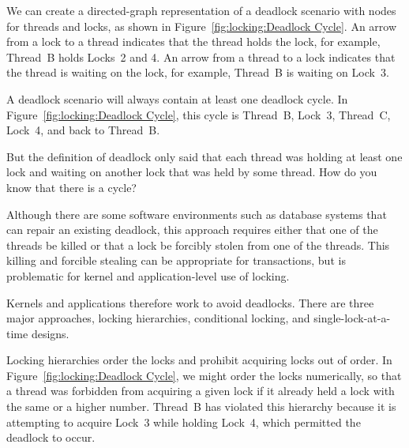 We can create a directed-graph representation of a deadlock scenario
with nodes for threads and locks, as shown in
Figure~\ref{fig:locking:Deadlock Cycle}.
An arrow from a lock to a thread indicates that the thread holds
the lock, for example, Thread~B holds Locks~2 and 4.
An arrow from a thread to a lock indicates that the thread is waiting
on the lock, for example, Thread~B is waiting on Lock~3.

A deadlock scenario will always contain at least one deadlock cycle.
In Figure~\ref{fig:locking:Deadlock Cycle}, this cycle is
Thread~B, Lock~3, Thread~C, Lock~4, and back to Thread~B.

\QuickQuiz{}
	But the definition of deadlock only said that each thread
	was holding at least one lock and waiting on another lock
	that was held by some thread.
	How do you know that there is a cycle?
 \QuickQuizEnd

Although there are some software environments such as database systems
that can repair an existing deadlock, this approach requires either that
one of the threads be killed or that a lock be forcibly stolen from one
of the threads.
This killing and forcible stealing can be appropriate for transactions,
but is problematic for kernel and application-level use of locking.

Kernels and applications therefore work to avoid deadlocks.
There are three major approaches,
locking hierarchies, conditional locking, and
single-lock-at-a-time designs.

Locking hierarchies order the locks and prohibit acquiring locks out
of order.
In Figure~\ref{fig:locking:Deadlock Cycle},
we might order the locks numerically, so that a thread was
forbidden from acquiring a given lock if it already held a lock
with the same or a higher number.
Thread~B has violated this hierarchy because it is attempting to
acquire Lock~3 while holding Lock~4, which permitted the deadlock
to occur.

